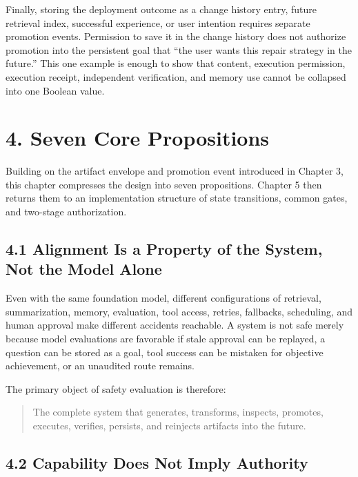 Finally, storing the deployment outcome as a change history entry, future retrieval index, successful experience, or user intention requires separate promotion events. Permission to save it in the change history does not authorize promotion into the persistent goal that ``the user wants this repair strategy in the future.'' This one example is enough to show that content, execution permission, execution receipt, independent verification, and memory use cannot be collapsed into one Boolean value.

\section{4. Seven Core Propositions}\label{seven-core-propositions}

Building on the artifact envelope and promotion event introduced in Chapter 3, this chapter compresses the design into seven propositions. Chapter 5 then returns them to an implementation structure of state transitions, common gates, and two-stage authorization.

\subsection{4.1 Alignment Is a Property of the System, Not the Model Alone}\label{alignment-is-a-property-of-the-system-not-the-model-alone}

Even with the same foundation model, different configurations of retrieval, summarization, memory, evaluation, tool access, retries, fallbacks, scheduling, and human approval make different accidents reachable. A system is not safe merely because model evaluations are favorable if stale approval can be replayed, a question can be stored as a goal, tool success can be mistaken for objective achievement, or an unaudited route remains.

The primary object of safety evaluation is therefore:

\begin{quote}
The complete system that generates, transforms, inspects, promotes, executes, verifies, persists, and reinjects artifacts into the future.
\end{quote}

\subsection{4.2 Capability Does Not Imply Authority}\label{capability-does-not-imply-authority}

